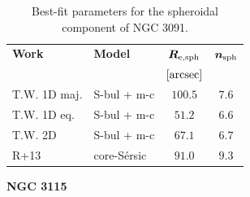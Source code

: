 \documentclass[preprint2]{emulateapj}
\begin{document}
  \begin{table}[h]
  \small
  \caption{Best-fit parameters for the spheroidal component of NGC 3091.}
  \begin{center}
  \begin{tabular}{llcc}
  \hline
  {\bf Work} & {\bf Model}   & $\bm R_{\rm e,sph}$    & $\bm n_{\rm sph}$ \\
    &  &  $[\rm arcsec]$ & \\
  \hline
  T.W. 1D maj. & S-bul + m-c & $100.5$  &  $7.6$ \\
  T.W. 1D eq.  & S-bul + m-c & $51.2$	&  $6.6$ \\
  T.W. 2D      & S-bul + m-c & $67.1$	&  $6.7$ \\
  \hline
  R+13         & core-S\'ersic & $91.0$  &  $9.3$ \\
  \hline
  \end{tabular}
  \end{center}
  \label{tab:n3091}
  \end{table}


  \clearpage\newpage\noindent
  {\bf NGC 3115 \\}
\end{document}
